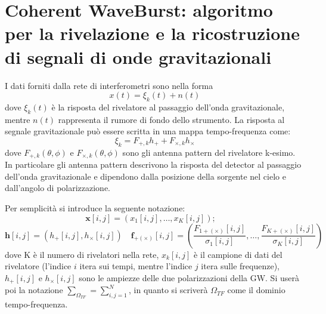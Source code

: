 \chapter[Coherent WaveBurst]{Coherent WaveBurst: algoritmo per la rivelazione e la ricostruzione di segnali di onde gravitazionali}
\label{chapter:cwb}
I dati forniti dalla rete di interferometri sono nella forma 
\[
x(t) = \xi_k(t) + n(t)
\]
dove $\xi_k(t)$ è la risposta del rivelatore al passaggio dell'onda gravitazionale, mentre $n(t)$ rappresenta il rumore di fondo dello strumento.
La risposta al segnale gravitazionale può essere scritta in una mappa tempo-frequenza come:
\begin{equation}
\xi_k = F_{+,k}h_+ + F_{\times,k}h_\times
\label{eqn:detector_response}
\end{equation}
dove $F_{+,k}(\theta,\phi)$ e $F_{\times,k}(\theta,\phi)$ sono gli antenna pattern del rivelatore k-esimo\cite{Klimenko_2008}. In particolare gli antenna pattern descrivono la risposta del detector al passaggio dell'onda gravitazionale e dipendono dalla posizione della sorgente nel cielo e dall'angolo di polarizzazione. 

Per semplicità si introduce la seguente notazione:
\[
\mathbf{x}[i,j] = \left(x_1[i,j],\dots, x_K[i,j] \right) ;
\quad
\]
\[
\mathbf{h}[i,j] = (h_+[i,j], h_\times[i,j])
\quad
\mathbf{f}_{+(\times)}[i,j] = \left(\frac{F_{1+(\times)}[i,j]}{\sigma_1[i,j]},\dots, \frac{F_{K+(\times)}[i,j]}{\sigma_K[i,j]} \right) 
\]
dove K è il numero di rivelatori nella rete, $x_k[i,j]$ è il campione di dati del rivelatore (l'indice $i$ itera sui tempi, mentre l'indice $j$ itera sulle frequenze)\cite{Klimenko_2008}, $h_{+}[i,j]$ e $h_{\times}[i,j]$ sono le ampiezze delle due polarizzazioni della GW. Si userà poi la notazione $\sum_{\Omega_{TF}} = \sum_{i,j=1}^N$, in quanto si scriverà $\Omega_{TF}$ come il dominio tempo-frequenza.

